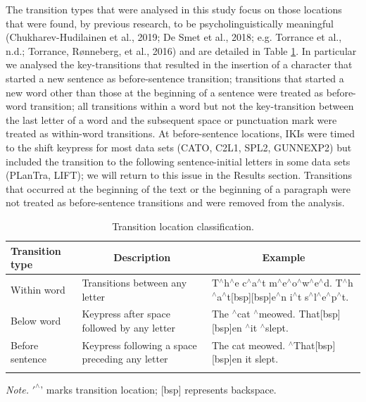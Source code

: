 \documentclass[
  english,
  man,floatsintext]{apa7}
\begin{document}
The transition types that were analysed in this study focus on those locations that were found, by previous research, to be psycholinguistically meaningful (Chukharev-Hudilainen et al., 2019; De Smet et al., 2018; e.g. Torrance et al., n.d.; Torrance, Rønneberg, et al., 2016) and are detailed in Table \ref{tab:keyloc}. In particular we analysed the key-transitions that resulted in the insertion of a character that started a new sentence as before-sentence transition; transitions that started a new word other than those at the beginning of a sentence were treated as before-word transition; all transitions within a word but not the key-transition between the last letter of a word and the subsequent space or punctuation mark were treated as within-word transitions. At before-sentence locations, IKIs were timed to the shift keypress for most data sets (CATO, C2L1, SPL2, GUNNEXP2) but included the transition to the following sentence-initial letters in some data sets (PLanTra, LIFT); we will return to this issue in the Results section. Transitions that occurred at the beginning of the text or the beginning of a paragraph were not treated as before-sentence transitions and were removed from the analysis.

\begin{table}[tbp]

\begin{center}
\begin{threeparttable}

\caption{\label{tab:keyloc}Transition location classification.}

\footnotesize{

\begin{tabular}{p{3cm}p{3cm}p{8cm}}
\toprule
Transition type & \multicolumn{1}{c}{Description} & \multicolumn{1}{c}{Example}\\
\midrule
Within word & Transitions between any letter & T$^{\wedge}$h$^{\wedge}$e c$^{\wedge}$a$^{\wedge}$t m$^{\wedge}$e$^{\wedge}$o$^{\wedge}$w$^{\wedge}$e$^{\wedge}$d. T$^{\wedge}$h$^{\wedge}$a$^{\wedge}$t[bsp][bsp]e$^{\wedge}$n i$^{\wedge}$t s$^{\wedge}$l$^{\wedge}$e$^{\wedge}$p$^{\wedge}$t.\\
Below word & Keypress after space followed by any letter & The $^{\wedge}$cat $^{\wedge}$meowed. That[bsp][bsp]en $^{\wedge}$it $^{\wedge}$slept.\\
Before sentence & Keypress following a space preceding any letter & The cat meowed. $^{\wedge}$That[bsp][bsp]en it slept.\\
\bottomrule
\addlinespace
\end{tabular}

}

\begin{tablenotes}[para]
\normalsize{\textit{Note.} $'^{\wedge}$' marks transition location; [bsp] represents backspace.}
\end{tablenotes}

\end{threeparttable}
\end{center}

\end{table}
\end{document}
